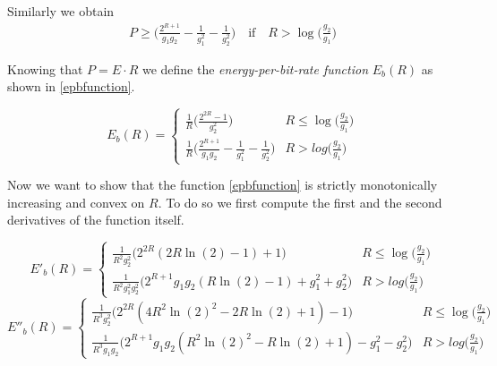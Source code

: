 Similarly we obtain
%
\begin{equation}
	\begin{gathered}
		P \geq \Big(\frac{2^{R+1}}{g_1g_2} -\frac{1}{g_1^2} - \frac{1}{g_2^2} \Big)
		\quad \text{if} \quad R >  \log\Big(\frac{g_2}{g_1}\Big)
	\end{gathered}
\end{equation}

Knowing that $P = E \cdot R$ we define the \textit{energy-per-bit-rate function} $E_b(R)$ as shown in \eqref{epbfunction}.

\begin{equation} E_b(R)=
	\begin{cases}
		\frac{1}{R}\Big(\frac{2^{2R}-1}{g_2^2}\Big) & R \leq \log\Big(\frac{g_2}{g_1}\Big) \\
		\frac{1}{R} \Big(\frac{2^{R+1}}{g_1g_2} -\frac{1}{g_1^2} - \frac{1}{g_2^2} \Big) & R > log\Big(\frac{g_2}{g_1}\Big)
	\end{cases}
	\label{epbfunction}
\end{equation}

Now we want to show that the function \eqref{epbfunction} is strictly monotonically increasing and convex on $R$. To do so we first compute the first and the second derivatives of the function itself.

\begin{equation}
	E'_b(R)= \begin{cases}
		\frac{1}{R^2g_2^2} \Big(2^{2R}(2R\ln(2)-1)+1\Big) & R \leq \log\Big(\frac{g_2}{g_1}\Big) \\
		\frac{1}{R^2g_1^2 g_2^2} \Big(2^{R+1} g_1 g_2 ( R \ln(2)-1)+g_1^2+g_2^2 \Big) & R > log\Big(\frac{g_2}{g_1}\Big)
\end{cases}
\end{equation}
%
\begin{equation}
	E''_b(R)= \begin{cases}
		\frac{1}{R^3g_2^2} \Big(2^{2R}(4R^2\ln(2)^2 -2R \ln(2)+1)-1\Big)  & R \leq \log\Big(\frac{g_2}{g_1}\Big) \\
		\frac{1}{R^3 g_1 g_2} \Big( 2^{R+1} g_1 g_2 ( R^2 \ln(2)^2 - R \ln(2) +1 ) -g_1^2 -g_2^2 \Big) & R > log\Big(\frac{g_2}{g_1}\Big)

\end{cases}
\end{equation}

